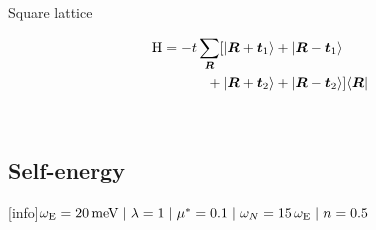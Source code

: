 \documentclass[10pt]{beamer}
\def\sep{\hspace{3pt}|\hspace{3pt}}
\begin{document}
    \begin{frame}[label=lattice]{Square lattice}
        \begin{figure}
            \small
            \begin{minipage}[c][4cm][c]{12cm/3}
                
            \end{minipage}%
            \begin{minipage}[c][4cm][c]{16cm/3}
                \begin{align*}
                    \mathrm H = -t \sum_{\boldsymbol R}
                         [  |\boldsymbol R + \boldsymbol t_1\rangle
                         &+ |\boldsymbol R - \boldsymbol t_1\rangle \\{}
                          + |\boldsymbol R + \boldsymbol t_2\rangle
                         &+ |\boldsymbol R - \boldsymbol t_2\rangle ]
                    \langle\boldsymbol R|
                \end{align*}
            \end{minipage}\\
            
        \end{figure}
    \end{frame}

    \subsection{Self-energy}

    [info]{$%
        \omega \sub E = 20 \, \unit{meV} \sep \lambda = 1 \sep \mu^* = 0.1 \sep
        \omega_N = 15 \, \omega \sub E \sep n = 0.5$}
\end{document}

